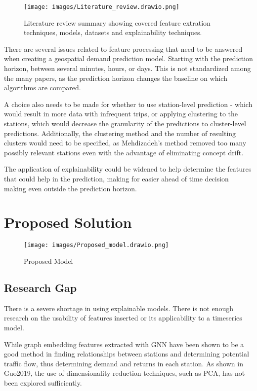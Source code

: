 \documentclass{article}
\begin{document}
\begin{figure}
\centering
\texttt{[image: images/Literature\_review.drawio.png]}
\caption{Literature review summary showing covered feature extration techniques, models, datasets and explainability techniques.}
\label{fig:Literature_review}
\end{figure}

There are several issues related to feature processing that need to be answered when creating a geospatial demand prediction model. Starting with the prediction horizon, between several minutes, hours, or days. This is not standardized among the many papers, as the prediction horizon changes the baseline on which algorithms are compared.

A choice also needs to be made for whether to use station-level prediction - which would result in more data with infrequent trips, or applying clustering to the stations, which would decrease the granularity of the predictions to cluster-level predictions. Additionally, the clustering method and the number of resulting clusters would need to be specified, as Mehdizadeh's method removed too many possibly relevant stations even with the advantage of eliminating concept drift.

The application of explainability could be widened to help determine the features that could help in the prediction, making for easier ahead of time decision making even outside the prediction horizon.

\section{Proposed Solution}

\begin{figure}
\hspace*{-2cm}  
\centering
\texttt{[image: images/Proposed\_model.drawio.png]}
\caption{Proposed Model}
\label{fig:proposed_model}
\end{figure}


\subsection{Research Gap}

There is a severe shortage in using explainable models. There is not enough research on the usability of features inserted or its applicability to a timeseries model.

While graph embedding features extracted with GNN have been shown to be a good method in finding relationships between stations and determining potential traffic flow, thus determining demand and returns in each station. As shown in Guo2019\cite{guo2019}, the use of dimensionality reduction techniques, such as PCA, has not been explored sufficiently.
\end{document}
